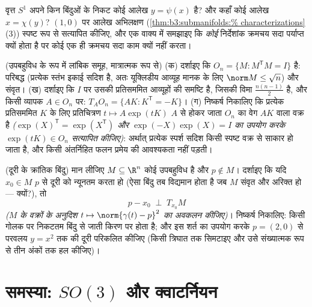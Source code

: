\begin{exercise}[$\star\star$]\label{exo:b3:submanifolds:10}
वृत्त $S^1$ अपने किन बिंदुओं के निकट कोई आलेख $y =
\psi(x)$ है? और कहाँ
कोई आलेख $x = \chi(y)$? $(1, 0)$ पर आलेख अभिलक्षण (\cref{thm:b3:submanifolds:%
characterizations}(3)) स्पष्ट रूप से
सत्यापित कीजिए, और एक वाक्य में समझाइए कि \emph{कोई} निर्देशांक
क्रमचय सदा पर्याप्त क्यों होता है पर कोई एक ही क्रमचय सदा काम
क्यों नहीं करता।
\end{exercise}

\begin{exercise}[$\star\star$]\label{exo:b3:submanifolds:11}
(उपबहुविध के रूप में लांबिक समूह, मात्रात्मक रूप से)
(क) दर्शाइए कि $O_n = \{M : M^{\mathsf T}M = I\}$  है: परिबद्ध (प्रत्येक स्तंभ इकाई सदिश
है, अतः यूक्लिडीय आव्यूह मानक के लिए $\norm M \leq
\sqrt n$) और संवृत।
(ख) दर्शाइए कि $I$ पर उसकी  प्रतिसममित आव्यूहों की
समष्टि है, जिसकी विमा $\frac{n(n-1)}2$ है, और किसी व्यापक $A \in O_n$ पर: $T_AO_n = \{AK : K^{\mathsf T} =
-K\}$।
(ग) निष्कर्ष निकालिए कि प्रत्येक प्रतिसममित $K$ के लिए
प्रतिचित्रण $t \mapsto A\exp(tK)$ $A$ से होकर जाता $O_n$ का वेग $AK$ वाला
वक्र है \emph{($\exp(X)^{\mathsf T} = \exp(X^{\mathsf T})$ और $\exp(-X)\exp(X) = I$ का उपयोग करके $\exp(tK) \in O_n$ सत्यापित
कीजिए)}: अर्थात् प्रत्येक स्पर्श सदिश किसी स्पष्ट वक्र से साकार
हो जाता है, और किसी अंतर्निहित फलन प्रमेय की आवश्यकता नहीं पड़ती।
\end{exercise}

\begin{exercise}[$\star\star$]\label{exo:b3:submanifolds:12}
(दूरी के क्रांतिक बिंदु) मान लीजिए $M \subseteq \R^n$ कोई उपबहुविध है और
$p \notin M$। दर्शाइए कि यदि $x_0 \in M$ $p$ से दूरी को न्यूनतम करता हो
(ऐसा बिंदु तब विद्यमान होता है जब $M$ संवृत और अरिक्त हो ---
क्यों?), तो
\[
p - x_0 \;\perp\; T_{x_0}M
\]
\emph{($M$ के वक्रों के अनुदिश $t \mapsto \norm{\gamma(t) - p}^2$ का अवकलन कीजिए)}। निष्कर्ष
निकालिए: किसी गोलक पर निकटतम बिंदु  से जाती किरण पर होता
है; और इस शर्त का उपयोग करके $p = (2, 0)$ से परवलय $y = x^2$ तक की दूरी
परिकलित कीजिए (किसी त्रिघात तक सिमटाइए और उसे संख्यात्मक रूप से
तीन अंकों तक हल कीजिए)।
\end{exercise}

\section{समस्या: \texorpdfstring{$SO(3)$}{SO(3)} और क्वाटर्नियन}

